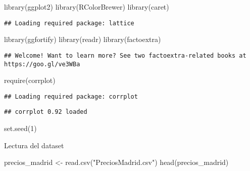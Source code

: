 \documentclass[
]{article}
\newenvironment{Shaded}{\begin{snugshade}}{\end{snugshade}}
\newcommand{\DecValTok}[1]{\textcolor[rgb]{0.00,0.00,0.81}{#1}}
\newcommand{\FunctionTok}[1]{\textcolor[rgb]{0.00,0.00,0.00}{#1}}
\newcommand{\NormalTok}[1]{#1}
\newcommand{\OtherTok}[1]{\textcolor[rgb]{0.56,0.35,0.01}{#1}}
\newcommand{\StringTok}[1]{\textcolor[rgb]{0.31,0.60,0.02}{#1}}
\begin{document}
\begin{Shaded}
\begin{Highlighting}[]
\FunctionTok{library}\NormalTok{(ggplot2)}
\FunctionTok{library}\NormalTok{(RColorBrewer)}
\FunctionTok{library}\NormalTok{(caret)}
\end{Highlighting}
\end{Shaded}

\begin{verbatim}
## Loading required package: lattice
\end{verbatim}

\begin{Shaded}
\begin{Highlighting}[]
\FunctionTok{library}\NormalTok{(ggfortify)}
\FunctionTok{library}\NormalTok{(readr)}
\FunctionTok{library}\NormalTok{(factoextra)}
\end{Highlighting}
\end{Shaded}

\begin{verbatim}
## Welcome! Want to learn more? See two factoextra-related books at https://goo.gl/ve3WBa
\end{verbatim}

\begin{Shaded}
\begin{Highlighting}[]
\FunctionTok{require}\NormalTok{(corrplot)}
\end{Highlighting}
\end{Shaded}

\begin{verbatim}
## Loading required package: corrplot
\end{verbatim}

\begin{verbatim}
## corrplot 0.92 loaded
\end{verbatim}

\begin{Shaded}
\begin{Highlighting}[]
\FunctionTok{set.seed}\NormalTok{(}\DecValTok{1}\NormalTok{)}
\end{Highlighting}
\end{Shaded}

Lectura del dataset

\begin{Shaded}
\begin{Highlighting}[]
\NormalTok{precios\_madrid }\OtherTok{\textless{}{-}} \FunctionTok{read.csv}\NormalTok{(}\StringTok{"PreciosMadrid.csv"}\NormalTok{)}
\FunctionTok{head}\NormalTok{(precios\_madrid)}
\end{Highlighting}
\end{Shaded}
\end{document}
